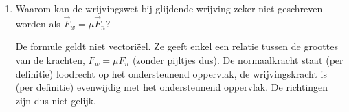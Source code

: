 


\begin{enumerate}



{dyn_theorie_1} %

{dyn_FV_9p143} %

{dyn_I_1} %
{dyn_I_2} %

{dyn_II_1} %
{dyn_II_2} %
{dyn_II_3} %
{dyn_II_4} %
{dyn_II_5} %
{dyn_II_6} %

{dyn_III_1} %
{dyn_III_2} %

{dyn_ECB_I_1} %

{dyn_ECB_II_2} %


{dyn_ECB_theorie_I_5}




\item Waarom kan de wrijvingswet bij glijdende wrijving zeker niet geschreven worden als $\vec{F}_w=\mu\vec{F}_n$?
\begin{oplossing}
\newline
De formule geldt niet vectori\"eel. Ze geeft enkel een relatie
tussen de groottes van de krachten, $F_w=\mu F_n$ (zonder pijltjes
dus). De normaalkracht staat (per definitie) loodrecht op het
ondersteunend oppervlak, de wrijvingskracht is (per definitie)
evenwijdig met het onder\-steu\-nend oppervlak. De richtingen zijn
dus niet gelijk.
\end{oplossing}


\end{enumerate}
